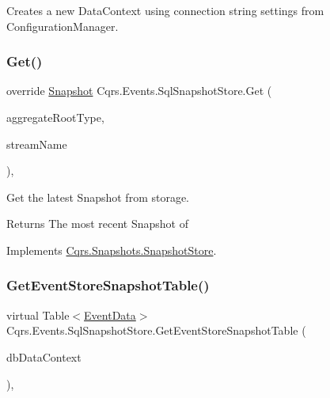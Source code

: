 Creates a new Data\+Context using connection string settings from Configuration\+Manager. 

\mbox{\label{classCqrs_1_1Events_1_1SqlSnapshotStore_a074064fc96d192dd6f68be2bb941bb9f_a074064fc96d192dd6f68be2bb941bb9f}} 
\subsubsection{\texorpdfstring{Get()}{Get()}}
{\footnotesize\ttfamily override \hyperlink{classCqrs_1_1Snapshots_1_1Snapshot}{Snapshot} Cqrs.\+Events.\+Sql\+Snapshot\+Store.\+Get (\begin{DoxyParamCaption}\item[{Type}]{aggregate\+Root\+Type,  }\item[{string}]{stream\+Name }\end{DoxyParamCaption})\hspace{0.3cm}{\ttfamily [protected]}, {\ttfamily [virtual]}}



Get the latest Snapshot from storage. 

\begin{DoxyReturn}{Returns}
The most recent Snapshot of
\end{DoxyReturn}


Implements \hyperlink{classCqrs_1_1Snapshots_1_1SnapshotStore_ab2ecab1a665c0f2097929d028fe4ac69_ab2ecab1a665c0f2097929d028fe4ac69}{Cqrs.\+Snapshots.\+Snapshot\+Store}.

\mbox{\label{classCqrs_1_1Events_1_1SqlSnapshotStore_a769ac716875ad2216085698d08ead1c2_a769ac716875ad2216085698d08ead1c2}} 
\subsubsection{\texorpdfstring{Get\+Event\+Store\+Snapshot\+Table()}{GetEventStoreSnapshotTable()}}
{\footnotesize\ttfamily virtual Table$<$\hyperlink{classCqrs_1_1Events_1_1EventData}{Event\+Data}$>$ Cqrs.\+Events.\+Sql\+Snapshot\+Store.\+Get\+Event\+Store\+Snapshot\+Table (\begin{DoxyParamCaption}\item[{Data\+Context}]{db\+Data\+Context }\end{DoxyParamCaption})\hspace{0.3cm}{\ttfamily [protected]}, {\ttfamily [virtual]}}



